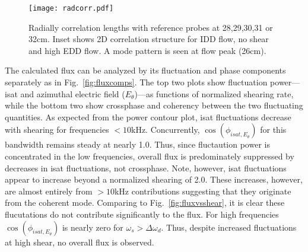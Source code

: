 \documentclass[%
 aps,
 prl,
 amsmath,amssymb,
 reprint,%
]{revtex4-1}
\begin{document}
\begin{figure}
\begin{center}
\texttt{[image: radcorr.pdf]}%
\caption{\label{fig:radcorr} Radially correlation lengths with reference probes at 28,29,30,31 or 32cm. Inset shows 2D correlation structure for IDD flow, no shear and high EDD flow. A mode pattern is seen at flow peak (26cm).}
\end{center}
\end{figure}

The calculated flux can be analyzed by its fluctuation and phase components separately as in Fig.~\ref{fig:fluxcomps}. The top two plots show fluctuation power---isat and azimuthal electric field ($E_{\theta}$)---as functions of normalized shearing rate, while the bottom two show crossphase and coherency between the two fluctuating quantities. As expected from the power contour plot, isat fluctuations decrease with shearing for frequencies $<10$kHz. Concurrently, $\cos(\phi_{isat,E_{\theta}})$ for this bandwidth remains steady at nearly 1.0. Thus, since fluctaution power is concentrated in the low frequencies, overall flux is predominately suppressed by decreases in isat fluctuations, not crossphase. Note, however, isat fluctuations appear to increase beyond a normalized shearing of 2.0. These increases, however, are almost entirely from $>10$kHz contributions suggesting that they originate from the coherent mode. Comparing to Fig.~\ref{fig:fluxvsshear}, it is clear these flucutations do not contribute significantly to the flux. For high frequencies $\cos(\phi_{isat,E_{\theta}})$ is nearly zero for $\omega_{s} > \Delta \omega_{d}$. Thus, despite increased fluctuations at high shear, no overall flux is observed. 

\end{document}
